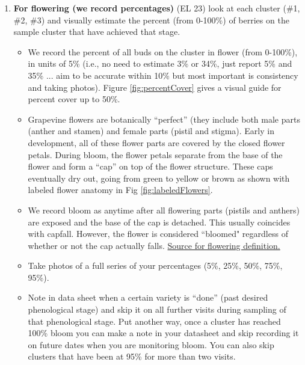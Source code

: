 \documentclass[11pt,letter]{article}
\newenvironment{smitemize}{
\begin{itemize}
  \setlength{\itemsep}{0pt}
  \setlength{\parskip}{0.8pt}
  \setlength{\parsep}{0pt}}
{\end{itemize}
}
\begin{document}
\begin{enumerate}
\item  {\bf For flowering (we record percentages)} (EL 23) look at each cluster (\#1, \#2, \#3) and visually estimate the percent (from 0-100\%) of berries on the sample cluster that have achieved that stage. 
	\begin{smitemize}
          \item We record the percent of all buds on the cluster in flower (from 0-100\%),  in units of  5\% (i.e., no need to estimate 3\% or 34\%, just report 5\% and 35\% ... aim to be accurate within 10\% but most important is consistency and taking photos). Figure \ref{fig:percentCover} gives a visual guide for percent cover up to 50\%.
	\item Grapevine flowers are botanically “perfect” (they include both male parts (anther and stamen) and female parts (pistil and stigma). Early in development, all of these flower parts are covered by the closed flower petals. During bloom, the flower petals separate from the base of the flower and form a “cap” on top of the flower structure. These caps eventually dry out, going from green to yellow or brown as shown with labeled flower anatomy in Fig \ref{fig:labeledFlowers}.
	\item We record bloom as anytime after all flowering parts (pistils and anthers) are exposed and the base of the cap is detached. This usually coincides with capfall. However, the flower is considered ``bloomed" regardless of whether or not the cap actually falls. \href{https://ives-technicalreviews.eu/article/view/2586}{Source for flowering definition.}
	\item Take photos of a full series of your percentages (5\%, 25\%, 50\%, 75\%, 95\%).
	\item Note in data sheet when a certain variety is ``done'' (past desired phenological stage) and skip it on all further visits during sampling of that phenological stage. Put another way, once a cluster has reached 100\% bloom you can make a note in your datasheet and skip recording it on future dates when you are monitoring bloom. You can also skip clusters that have been at 95\% for more than two visits.
	\end{smitemize}
	

\end{enumerate}
\end{document}
